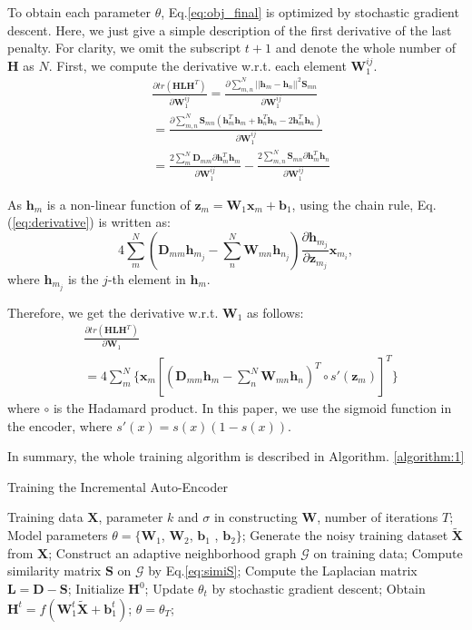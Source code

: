 \documentclass{article}
\def \bb{\mathbf b}
\def \x{\mathbf x}
\def \z{\mathbf z}
\def \h{\mathbf h}
\def \D{\mathbf D}
\def \HH{\mathbf H}
\def \LL{\mathbf L}
\def \SSS{\mathbf S}
\def \W{\mathbf W}
\def \X{\mathbf X}
\def \GM{{\mathcal G}}
\begin{document}
To obtain each parameter $\theta$, Eq.\ref{eq:obj_final} is optimized by stochastic gradient descent. Here, we just give a simple description of the first derivative of the last penalty. For clarity, we omit the subscript $t+1$ and denote the whole number of $\HH$ as $N$.  First, we compute the derivative w.r.t. each element $\W_1^{ij}$.
\begin{equation}
  \begin{split}
    &\frac{\partial tr(\HH \LL \HH^T)}{\partial \W_1^{ij}} = \frac{\partial \sum_{m,n}^N||\h_m - \h_n||^2\SSS_{mn}}{\partial \W_1^{ij}} \\
    & = \frac{\partial \sum_{m,n}^N \SSS_{mn}(\h_m^T\h_m + \h_n^T\h_n - 2\h_m^T\h_n)}{\partial \W_1^{ij}}\\
    & = \frac{2\sum_m^N \D_{mm} \partial \h_m^T\h_m}{\partial \W_1^{ij}} - \frac{2\sum_{m,n}^N \SSS_{mn}\partial \h_m^T\h_n}{\partial \W_1^{ij}}
  \end{split}
  \label{eq:derivative}
\end{equation}

As $\h_m$ is a non-linear function of $\z_m = \W_1 \x_m + \bb_1$, using the chain rule, Eq.(\ref{eq:derivative}) is written as:
\begin{equation}
4\sum_m^N(\D_{mm} \h_{m_j} - \sum_{n}^N \W_{mn}\h_{n_j})\frac{\partial \h_{m_j}}{\partial \z_{m_j}} \x_{m_i},
\end{equation}
where $\h_{m_j}$ is the $j$-th element in $\h_m$.

Therefore, we get the derivative w.r.t. $\W_1$ as follows:
\begin{equation}
\begin{split}
  &\frac{\partial tr(\HH \LL \HH^T)}{\partial \W_1}\\
  & = 4 \sum_{m}^N \{ \x_m[(\D_{mm} \h_m  - \sum_{n}^N\W_{mn}\h_n)^T \circ s'(\z_m)]^T\}
\end{split}
\end{equation}
where $\circ$ is the Hadamard product. In this paper, we use the sigmoid function in the encoder, where $s'(x) = s(x)(1-s(x))$.

In summary, the whole training algorithm is described in Algorithm. \ref{algorithm:1}
\begin{algorithm}[htb]
  \caption{Training the Incremental Auto-Encoder}
  \begin{algorithmic}[1]
    \REQUIRE Training data $\X$,  parameter $k$ and $\sigma$ in constructing $\W$, number of iterations $T$;
    \ENSURE Model parameters $\theta = \{\W_1$, $\W_2$, $\bb_1$ , $\bb_2\}$;
    \STATE Generate the noisy training dataset $\tilde{\X}$ from $\X$;
    \STATE Construct an adaptive neighborhood graph $\GM$ on training data;
    \STATE Compute similarity matrix $\SSS$ on $\GM$ by Eq.\ref{eq:simiS};
    \STATE Compute the Laplacian matrix $\LL = \D - \SSS$;
    \STATE Initialize $\HH^0$;
       \STATE Update $\theta_t$ by stochastic gradient descent;
       \STATE Obtain $\HH^t = f({\W_1^t \tilde{\X} + \bb_1^t})$;
    \ENDFOR
    \STATE $\theta = \theta_T$;
  \end{algorithmic}
  \label{algorithm:1}
\end{algorithm}
\end{document}
